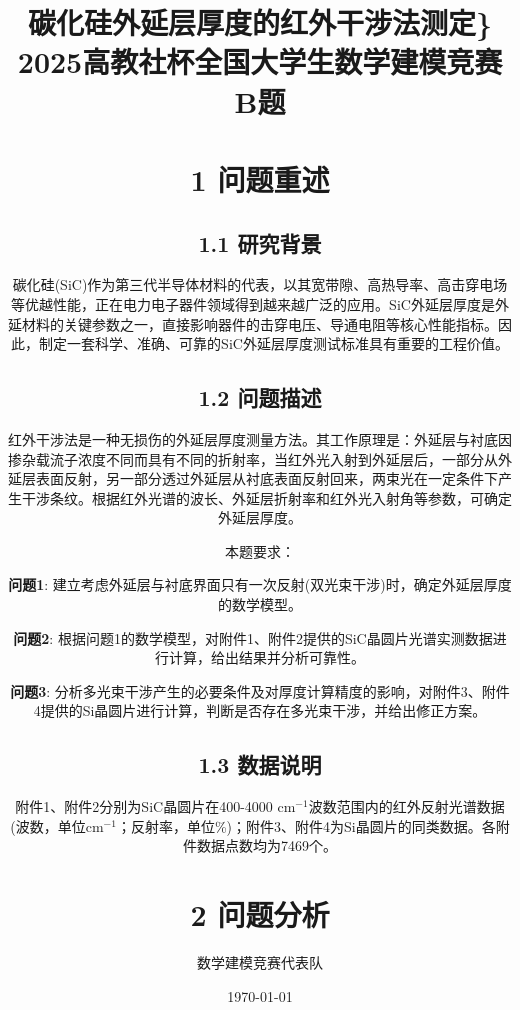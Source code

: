 \documentclass[12pt,a4paper]{article}
\begin{document}
\title{碳化硅外延层厚度的红外干涉法测定\}
{\Large 2025高教社杯全国大学生数学建模竞赛 B题}
\author{数学建模竞赛代表队}
\date{\today}
\maketitle
\newpage\section{1 问题重述}

\subsection{1.1 研究背景}
碳化硅(SiC)作为第三代半导体材料的代表，以其宽带隙、高热导率、高击穿电场等优越性能，正在电力电子器件领域得到越来越广泛的应用。SiC外延层厚度是外延材料的关键参数之一，直接影响器件的击穿电压、导通电阻等核心性能指标。因此，制定一套科学、准确、可靠的SiC外延层厚度测试标准具有重要的工程价值。

\subsection{1.2 问题描述}
红外干涉法是一种无损伤的外延层厚度测量方法。其工作原理是：外延层与衬底因掺杂载流子浓度不同而具有不同的折射率，当红外光入射到外延层后，一部分从外延层表面反射，另一部分透过外延层从衬底表面反射回来，两束光在一定条件下产生干涉条纹。根据红外光谱的波长、外延层折射率和红外光入射角等参数，可确定外延层厚度。

本题要求：
\par\textbf{问题1}: 建立考虑外延层与衬底界面只有一次反射(双光束干涉)时，确定外延层厚度的数学模型。
\par\textbf{问题2}: 根据问题1的数学模型，对附件1、附件2提供的SiC晶圆片光谱实测数据进行计算，给出结果并分析可靠性。
\par\textbf{问题3}: 分析多光束干涉产生的必要条件及对厚度计算精度的影响，对附件3、附件4提供的Si晶圆片进行计算，判断是否存在多光束干涉，并给出修正方案。

\subsection{1.3 数据说明}
附件1、附件2分别为SiC晶圆片在400-4000 cm$^{-1}$波数范围内的红外反射光谱数据(波数，单位cm$^{-1}$；反射率，单位\%)；附件3、附件4为Si晶圆片的同类数据。各附件数据点数均为7469个。

\section{2 问题分析}

}
\end{document}
